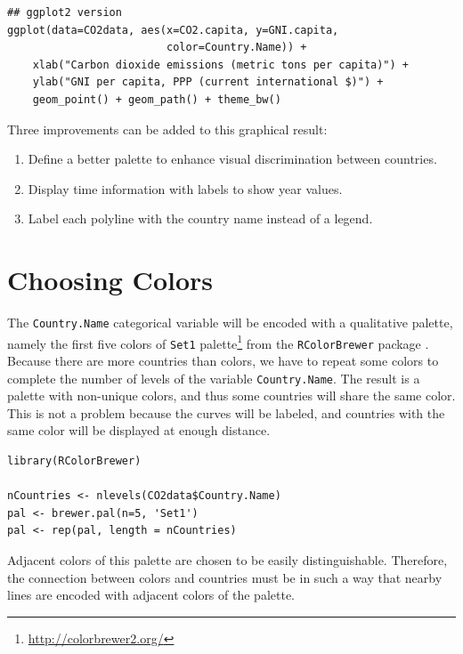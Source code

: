 \lstset{language=r,label= ,caption= ,captionpos=b,numbers=none}
\begin{lstlisting}
## ggplot2 version
ggplot(data=CO2data, aes(x=CO2.capita, y=GNI.capita,
                         color=Country.Name)) +
    xlab("Carbon dioxide emissions (metric tons per capita)") +
    ylab("GNI per capita, PPP (current international $)") +
    geom_point() + geom_path() + theme_bw()
\end{lstlisting}

Three improvements can be added to this graphical result: 
\begin{enumerate}
\item Define a better palette to enhance visual discrimination between
countries.
\item Display time information with labels to show year values.
\item Label each polyline with the country name instead of a legend.
\end{enumerate}

\section{Choosing Colors}
\label{sec:org89622e3}
The \texttt{Country.Name} categorical variable will be encoded with a
qualitative palette, namely the first five colors of \texttt{Set1}
palette\footnote{\url{http://colorbrewer2.org/}} from the \texttt{RColorBrewer} package
\cite{Neuwirth2011}. Because there are more countries than colors, we
have to repeat some colors to complete the number of levels of the
variable \texttt{Country.Name}. The result is a palette with non-unique
colors, and thus some countries will share the same color. This is not
a problem because the curves will be labeled, and countries with the
same color will be displayed at enough distance.


\lstset{language=r,label= ,caption= ,captionpos=b,numbers=none}
\begin{lstlisting}
library(RColorBrewer)

nCountries <- nlevels(CO2data$Country.Name)
pal <- brewer.pal(n=5, 'Set1')
pal <- rep(pal, length = nCountries)
\end{lstlisting}

Adjacent colors of this palette are chosen to be easily
distinguishable. Therefore, the connection between colors and
countries must be in such a way that nearby lines are encoded
with adjacent colors of the palette.

